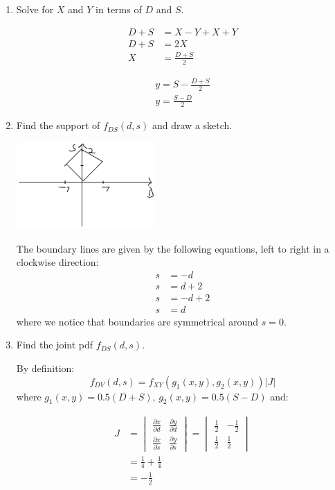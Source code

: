 \documentclass{article}
\newcommand{\1}{\mathbf{1}}
\begin{document}
\begin{enumerate}
    \item Solve for $X$  and $Y$ in terms of $D$ and $S$.

    \begin{align*}
        D + S &= X - Y + X + Y \\
        D + S &= 2X \\
        X &= \frac{D + S}{2}
    \end{align*}

    \begin{align*} 
        y = S - \frac{D + S}{2} \\
        y = \frac{S - D}{2}
    \end{align*}

    \item Find the support of $f_{DS}(d,s)$ and draw a sketch.
    
    \begin{center}
    \includegraphics[width=200px]{STATS509/HW4/HW4Figures/picasso4aa.png}
    \end{center}
    
    The boundary lines are given by the following equations, left to right in a clockwise direction:
    \begin{align*}
        s &= -d \\
        s &= d+2 \\
        s &= -d+2 \\
        s &= d
    \end{align*}
    where we notice that boundaries are symmetrical around $s=0$. 
    
    \newpage
    \item Find the joint pdf $f_{DS}(d,s)$.
    
    By definition:
    $$f_{DV}(d,s) = f_{XY}(g_1(x,y), g_2(x,y)) |J|$$
    where $g_1(x,y)=0.5(D+S)$, $g_2(x,y)=0.5(S-D)$ and:
    
    \begin{align*}
    J &= \begin{vmatrix}
        \frac{\partial x}{\partial d} & \frac{\partial y}{\partial d} \\ 
        \frac{\partial x}{\partial s} & \frac{\partial y}{\partial s}
        \end{vmatrix} 
     = \begin{vmatrix}
        \frac{1}{2} & -\frac{1}{2} \\ 
        \frac{1}{2} & \frac{1}{2}
        \end{vmatrix} \\
    &= \frac{1}{4} + \frac{1}{4} \\
    &= - \frac{1}{2}
    \end{align*}
    

\end{enumerate}
\end{document}
